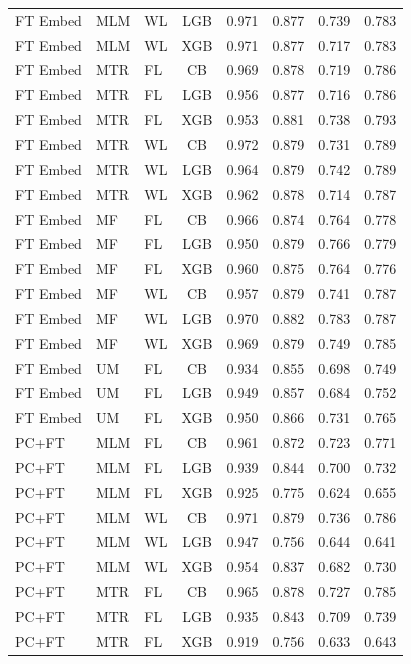 \documentclass[9pt,a4paper]{article}
\begin{document}
\begin{scriptsize}
\begin{longtable}{lllcrrrr}
FT Embed & MLM & WL & LGB & 0.971 & 0.877 & 0.739 & 0.783 \\
FT Embed & MLM & WL & XGB & 0.971 & 0.877 & 0.717 & 0.783 \\
FT Embed & MTR & FL & CB  & 0.969 & 0.878 & 0.719 & 0.786 \\
FT Embed & MTR & FL & LGB & 0.956 & 0.877 & 0.716 & 0.786 \\
FT Embed & MTR & FL & XGB & 0.953 & 0.881 & 0.738 & 0.793 \\
FT Embed & MTR & WL & CB  & 0.972 & 0.879 & 0.731 & 0.789 \\
FT Embed & MTR & WL & LGB & 0.964 & 0.879 & 0.742 & 0.789 \\
FT Embed & MTR & WL & XGB & 0.962 & 0.878 & 0.714 & 0.787 \\
FT Embed & MF  & FL & CB  & 0.966 & 0.874 & 0.764 & 0.778 \\
FT Embed & MF  & FL & LGB & 0.950 & 0.879 & 0.766 & 0.779 \\
FT Embed & MF  & FL & XGB & 0.960 & 0.875 & 0.764 & 0.776 \\
FT Embed & MF  & WL & CB  & 0.957 & 0.879 & 0.741 & 0.787 \\
FT Embed & MF  & WL & LGB & 0.970 & 0.882 & 0.783 & 0.787 \\
FT Embed & MF  & WL & XGB & 0.969 & 0.879 & 0.749 & 0.785 \\
FT Embed & UM  & FL & CB  & 0.934 & 0.855 & 0.698 & 0.749 \\
FT Embed & UM  & FL & LGB & 0.949 & 0.857 & 0.684 & 0.752 \\
FT Embed & UM  & FL & XGB & 0.950 & 0.866 & 0.731 & 0.765 \\
\midrule
PC+FT & MLM & FL & CB  & 0.961 & 0.872 & 0.723 & 0.771 \\
PC+FT & MLM & FL & LGB & 0.939 & 0.844 & 0.700 & 0.732 \\
PC+FT & MLM & FL & XGB & 0.925 & 0.775 & 0.624 & 0.655 \\
PC+FT & MLM & WL & CB  & 0.971 & 0.879 & 0.736 & 0.786 \\
PC+FT & MLM & WL & LGB & 0.947 & 0.756 & 0.644 & 0.641 \\
PC+FT & MLM & WL & XGB & 0.954 & 0.837 & 0.682 & 0.730 \\
PC+FT & MTR & FL & CB  & 0.965 & 0.878 & 0.727 & 0.785 \\
PC+FT & MTR & FL & LGB & 0.935 & 0.843 & 0.709 & 0.739 \\
PC+FT & MTR & FL & XGB & 0.919 & 0.756 & 0.633 & 0.643 \\

\end{longtable}
\end{scriptsize}
\end{document}
